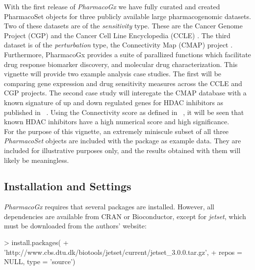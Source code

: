 \documentclass[11pt]{article}
\begin{document}
With the first release of \textit{PharmacoGx} we have fully curated and
created PharmacoSet objects for three publicly available large pharmacogenomic
datasets. Two of these datasets are of the \textit{sensitivity} type. These
are the Cancer Genome Project (CGP) \cite{Garnett:2012fc} and the Cancer Cell
Line Encyclopedia (CCLE) \cite{Barretina:2012fp}. The third dataset is of the
\textit{perturbation} type, the Connectivity Map (CMAP) project
\cite{Lamb:2006hf}.\\

Furthermore, PharmacoGx provides a suite of parallized functions which
facilitate drug response biomarker discovery, and molecular drug
characterization. This vignette will provide two example analysis case
studies. The first will be comparing gene expression and drug sensitivity
measures across the CCLE and CGP projects. The second case study will
interegate the CMAP database with a known signature of up and down regulated
genes for HDAC inhibitors as published in ~\cite{Glaser:2003gk}. Using the
Connectivity score as defined in ~\cite{Lamb:2006hf}, it will be seen that
known HDAC inhibitors have a high numerical score and high significance.\\ %

For the purpose of this vignette, an extremely miniscule subset of all three
\textit{PharmacoSet} objects are included with the package as example data.
They are included for illustrative purposes only, and the results obtained
with them will likely be meaningless.\\


\subsection{Installation and Settings}

\textit{PharmacoGx} requires that several packages are installed. However, all dependencies are available from CRAN or Bioconductor, except for \textit{jetset}, which must be downloaded from the authors' website:

\begin{Schunk}
\begin{Sinput}
> install.packages(
+   'http://www.cbs.dtu.dk/biotools/jetset/current/jetset_3.0.0.tar.gz',
+    repos = NULL, type = 'source')
\end{Sinput}
\end{Schunk}
\end{document}
